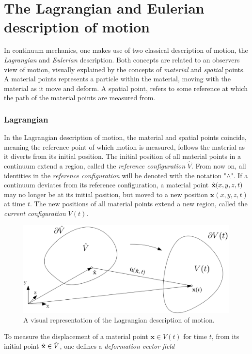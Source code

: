 \section{The Lagrangian and Eulerian description of motion}
In continuum mechanics, one makes use of two classical description of motion, the \textit{Lagrangian} and \textit{Eulerian} description. Both concepts are related to an observers view of motion, visually explained by the concepts of \textit{material} and \textit{spatial} points. A material points represents a particle within the material, moving with the material as it move and deform. A spatial point, refers to some reference at which the path of the material points are measured from. 

\subsubsection*{Lagrangian}
In the Lagrangian description of motion, the material and spatial points coincide, meaning the reference point of which motion is measured, follows the material as it diverts from its initial position. The initial position of all material points in a continuum extend a region, called the \textit{reference configuration} $\hat{V}$. From now on, all identities in the \textit{reference configuration} will be denoted with the notation "$\wedge$". If a continuum deviates from its reference configuration, a material point $\hat{\mathbf{x}}(x, y, z ,t)$ may no longer be at its initial position, but moved to a new position $\mathbf{x}(x, y, z, t)$ at time $t$. The new positions of all material points extend a new region, called the \textit{current configuration} $V(t)$. 
\begin{figure}[h!]
  \centering
    \includegraphics[scale=0.4]{./Fig/lagframe.png}
      \caption{A visual representation of the Lagrangian description of motion.}
\end{figure}
\newpage
To measure the displacement of a material point $\mathbf{x} \in V(t)$ for time $t$, from its initial point $\hat{\mathbf{x}} \in \hat{V}$, one defines a \textit{deformation vector field} 
